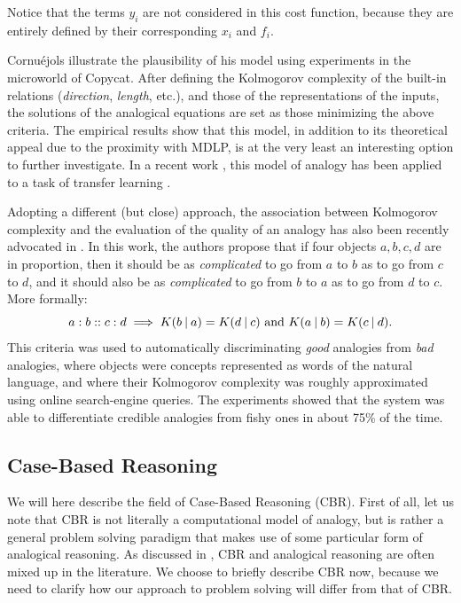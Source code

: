 Notice that the terms $y_i$ are not considered in this cost function, because
they are entirely defined by their corresponding $x_i$ and $f_i$.

Cornuéjols illustrate the plausibility of his model using experiments in the
microworld of Copycat. After defining the Kolmogorov complexity of the built-in
relations (\textit{direction}, \textit{length}, etc.), and those of the
representations of the inputs, the solutions of the analogical equations are
set as those minimizing the above criteria. The empirical results show that
this model, in addition to its theoretical appeal due to the proximity with
MDLP, is at the very least an interesting option to further investigate. In a
recent work , this model of analogy has been applied to a task of transfer
learning \cite{CorMur16}.

Adopting a different (but close) approach, the association between Kolmogorov
complexity and the evaluation of the quality of an analogy has also been
recently advocated in \cite{BayPraRic12}. In this work, the authors propose
that if four objects $a, b, c, d$ are in proportion, then it should be as
\textit{complicated} to go from $a$ to $b$ as to go from $c$ to $d$, and it
should also be as \textit{complicated} to go from $b$ to $a$ as to go from $d$
to $c$. More formally:
$$a:b::c:d \implies K(b \:\vert\: a) = K(d \:\vert\: c) \text{ and } K(a \:\vert\: b) =
K(c \:\vert\: d).$$
This criteria was used to automatically discriminating \textit{good} analogies
from \textit{bad} analogies, where objects were concepts represented as words
of the natural language, and where their Kolmogorov complexity was roughly
approximated using online search-engine queries. The experiments showed that
the system was able to differentiate credible analogies from fishy ones in
about 75\% of the time.

\subsection{Case-Based Reasoning}

We will here describe the field of Case-Based Reasoning (CBR). First of all,
let us note that CBR is not literally a computational model of analogy, but is
rather a general problem solving paradigm that makes use of some particular
form of analogical reasoning. As discussed in \cite{AamPla94}, CBR and
analogical reasoning are often mixed up in the literature.  We choose to
briefly describe CBR now, because we need to clarify how our approach to
problem solving will differ from that of CBR.

